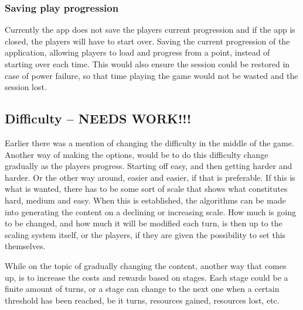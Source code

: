\subsubsection{Saving play progression}
Currently the app does not save the players current progression and if the app is closed, the players will have to start over. Saving the current progression of the application, allowing players to load and progress from a point, instead of starting over each time. This would also ensure the session could be restored in case of power failure, so that time playing the game would not be wasted and the session lost.

\subsection{Difficulty -- NEEDS WORK!!!}
Earlier there was a mention of changing the difficulty in the middle of the game. Another way of making the options, would be to do this difficulty change gradually as the players progress. Starting off easy, and then getting harder and harder. Or the other way around, easier and easier, if that is preferable. If this is what is wanted, there has to be some sort of scale that shows what constitutes hard, medium and easy. When this is established, the algorithms can be made into generating the content on a declining or increasing scale. How much is going to be changed, and how much it will be modified each turn, is then up to the scaling system itself, or the players, if they are given the possibility to set this themselves.

While on the topic of gradually changing the content, another way that comes up, is to increase the costs and rewards based on stages.
Each stage could be a finite amount of turns, or a stage can change to the next one when a certain threshold has been reached, be it turns, resources gained, resources lost, etc.